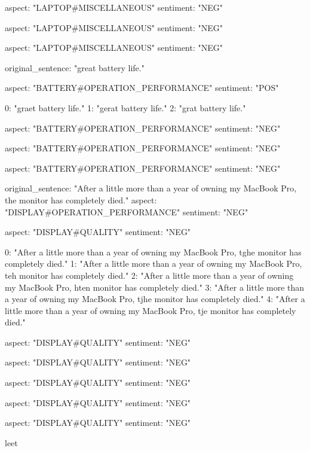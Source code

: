     aspect: "LAPTOP#MISCELLANEOUS"
    sentiment: "NEG"

    aspect: "LAPTOP#MISCELLANEOUS"
    sentiment: "NEG"

aspect: "LAPTOP#MISCELLANEOUS"
sentiment: "NEG"

original_sentence: "great battery life."

    aspect: "BATTERY#OPERATION_PERFORMANCE"
    sentiment: "POS"

0: "graet battery life."
1: "gerat battery life."
2: "grat battery life."

    aspect: "BATTERY#OPERATION_PERFORMANCE"
    sentiment: "NEG"

    aspect: "BATTERY#OPERATION_PERFORMANCE"
    sentiment: "NEG"

aspect: "BATTERY#OPERATION_PERFORMANCE"
sentiment: "NEG"

original_sentence: "After a little more than a year of owning my MacBook Pro, the monitor has completely died."
aspect: "DISPLAY#OPERATION_PERFORMANCE"
sentiment: "NEG"

    aspect: "DISPLAY#QUALITY"
    sentiment: "NEG"

0: "After a little more than a year of owning my MacBook Pro, tghe monitor has completely died."
1: "After a little more than a year of owning my MacBook Pro, teh monitor has completely died."
2: "After a little more than a year of owning my MacBook Pro, hten monitor has completely died."
3: "After a little more than a year of owning my MacBook Pro, tjhe monitor has completely died."
4: "After a little more than a year of owning my MacBook Pro, tje monitor has completely died."

    aspect: "DISPLAY#QUALITY"
    sentiment: "NEG"

    aspect: "DISPLAY#QUALITY"
    sentiment: "NEG"

    aspect: "DISPLAY#QUALITY"
    sentiment: "NEG"

    aspect: "DISPLAY#QUALITY"
    sentiment: "NEG"

aspect: "DISPLAY#QUALITY"
sentiment: "NEG"






leet


